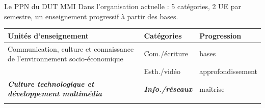 \documentclass[professionalfont, 12pt, dvipdfmx, default, cjk]{beamer}
\begin{document}
\begin{frame}{Le PPN du DUT MMI}
\protect\hypertarget{le-ppn-du-dut-mmi}{}
Dans l'organisation actuelle : 5 catégories, 2 UE par semestre, un
enseignement progressif à partir des bases.

\begin{longtable}[]{@{}lll@{}}
\toprule
\begin{minipage}[b]{0.30\columnwidth}\raggedright
Unités d'enseignement\strut
\end{minipage} & \begin{minipage}[b]{0.27\columnwidth}\raggedright
Catégories\strut
\end{minipage} & \begin{minipage}[b]{0.35\columnwidth}\raggedright
Progression\strut
\end{minipage}\tabularnewline
\midrule
\endhead
\begin{minipage}[t]{0.30\columnwidth}\raggedright
Communication, culture et connaissance de l'environnement
socio-économique\strut
\end{minipage} & \begin{minipage}[t]{0.27\columnwidth}\raggedright
Com./écriture\strut
\end{minipage} & \begin{minipage}[t]{0.35\columnwidth}\raggedright
bases\strut
\end{minipage}\tabularnewline
\begin{minipage}[t]{0.30\columnwidth}\raggedright
\strut
\end{minipage} & \begin{minipage}[t]{0.27\columnwidth}\raggedright
Esth./vidéo\strut
\end{minipage} & \begin{minipage}[t]{0.35\columnwidth}\raggedright
approfondissement\strut
\end{minipage}\tabularnewline
\begin{minipage}[t]{0.30\columnwidth}\raggedright
\textbf{\emph{Culture technologique et développement multimédia}}\strut
\end{minipage} & \begin{minipage}[t]{0.27\columnwidth}\raggedright
\textbf{\emph{Info./réseaux}}\strut
\end{minipage} & \begin{minipage}[t]{0.35\columnwidth}\raggedright
maîtrise\strut
\end{minipage}\tabularnewline
\begin{minipage}[t]{0.30\columnwidth}\raggedright

\end{minipage}
\end{longtable}
\end{frame}
\end{document}
